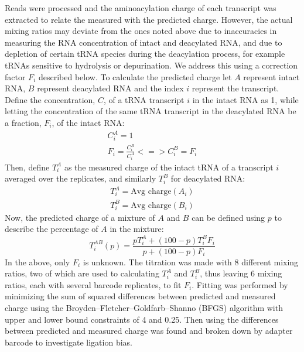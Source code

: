\documentclass[9pt,lineno]{elife}
\begin{document}
Reads were processed and the aminoacylation charge of each transcript was extracted to relate the measured with the predicted charge.
However, the actual mixing ratios may deviate from the ones noted above due to inaccuracies in measuring the RNA concentration of intact and deacylated RNA, and due to depletion of certain tRNA species during the deacylation process, for example tRNAs sensitive to hydrolysis or depurination.
We address this using a correction factor $F_i$ described below.
To calculate the predicted charge let $A$ represent intact RNA, $B$ represent deacylated RNA and the index $i$ represent the transcript.
Define the concentration, $C$, of a tRNA transcript $i$ in the intact RNA as 1, while letting the concentration of the same tRNA transcript in the deacylated RNA be a fraction, $F_i$, of the intact RNA:
\begin{equation}
\begin{split}
C^A_i = 1 \\
F_i = \frac{C^B_i}{C^A_i} <=> C^B_i = F_i
\end{split}
\end{equation}
Then, define $T^A_i$ as the measured charge of the intact tRNA of a transcript $i$ averaged over the replicates, and similarly $T^B_i$ for deacylated RNA:
\begin{equation}
\begin{split}
T^A_i = \text{Avg charge}(A_i) \\
T^B_i = \text{Avg charge}(B_i)
\end{split}
\end{equation}
Now, the predicted charge of a mixture of $A$ and $B$ can be defined using $p$ to describe the percentage of $A$ in the mixture:
\begin{equation}
\label{eq:pred_charge}
T^{AB}_i(p) = \frac{p T^A_i + (100-p) T^B_i F_i}{p + (100-p) F_i}
\end{equation}
In the above, only $F_i$ is unknown.
The titration was made with 8 different mixing ratios, two of which are used to calculating $T^A_i$ and $T^B_i$, thus leaving 6 mixing ratios, each with several barcode replicates, to fit $F_i$.
Fitting was performed by minimizing the sum of squared differences between predicted and measured charge using the Broyden–Fletcher–Goldfarb–Shanno (BFGS) algorithm with upper and lower bound constraints of 4 and 0.25.
Then using  the differences between predicted and measured charge was found and broken down by adapter barcode to investigate ligation bias.
\end{document}

